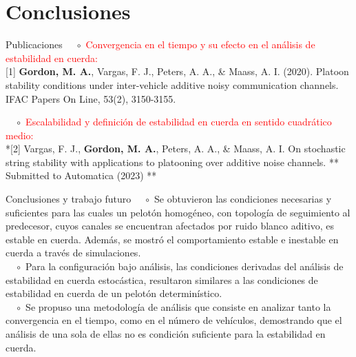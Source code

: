 \documentclass[aspectratio=169,dvipsnames]{beamer}
\begin{document}
\section{Conclusiones}
\begin{frame}{Publicaciones}
\justify
$\quad \circ$ \textcolor{red}{Convergencia en el tiempo y su efecto en el análisis de estabilidad en cuerda:}\\
\vspace{2mm}
[1] {\bf Gordon, M. A.}, Vargas, F. J., Peters, A. A., \& Maass, A. I. (2020). Platoon stability conditions under inter-vehicle additive noisy communication channels. IFAC Papers On Line, 53(2), 3150-3155. \\
\vspace{2mm}

\pause
\vspace{3mm}
$\quad \circ$  \textcolor{red}{Escalabilidad y definición de estabilidad en cuerda en sentido cuadrático medio:}\\
\vspace{2mm}
*[2] Vargas, F. J., {\bf Gordon, M. A.}, Peters, A. A., \& Maass, A. I. On stochastic string stability with applications to platooning over additive noise channels. ** Submitted to Automatica (2023) **
\end{frame}


\begin{frame}{Conclusiones y trabajo futuro}
\justify
$\quad \circ$ Se obtuvieron las condiciones necesarias y suficientes para las cuales un pelotón homogéneo, con topología de seguimiento al predecesor, cuyos canales se encuentran afectados por ruido blanco aditivo, es estable en cuerda. Además, se mostró el comportamiento estable e inestable en cuerda a través de simulaciones.  \\
\pause
\vspace{4mm}
$\quad \circ$ Para la configuración bajo análisis, las condiciones derivadas del análisis de estabilidad en cuerda estocástica, resultaron similares a las condiciones de estabilidad en cuerda de un pelotón determinístico. \\
\pause
\vspace{4mm}
$\quad \circ$ Se propuso una metodología de análisis que consiste en analizar tanto la convergencia en el tiempo, como en el número de vehículos, demostrando que el análisis de una sola de ellas no es condición suficiente para la estabilidad en cuerda.
\end{frame}
\end{document}
